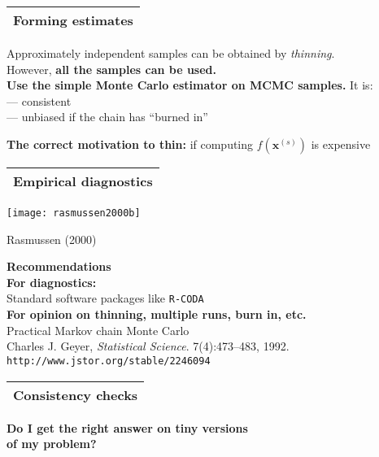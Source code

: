 \documentclass[25pt,landscape]{foils}
\newcommand{\Gray}{\textcolor{mygray}}
\newcommand{\Green}{\textcolor{mypine}}
\newcommand{\myfoilhead}[1]{
\newpage
\vspace*{-1cm}
\Gray{
\begin{tabular*}{\textwidth}{l}
{\bf \Huge #1} \\
\bottomrule
\end{tabular*}}}
\newcommand{\bx}{\mathbf{x}}
\begin{document}
\myfoilhead{Forming estimates}

\vfill

Approximately independent samples can be obtained by \emph{thinning}.\\
However, \Green{\bf all the samples can be used.}\\

\Green{\bf Use the simple Monte Carlo estimator on MCMC samples.} It is:\\
\hspace*{3cm}--- consistent\\
\hspace*{3cm}--- unbiased if the chain has ``burned in''

\vfill
\Green{\bf The correct motivation to thin:} if computing $f(\bx^{(s)})$ is expensive
\vfill

\myfoilhead{Empirical diagnostics}

\vspace*{1cm}

\centerline{\texttt{[image: rasmussen2000b]}}
\begin{flushright}
    \Gray{Rasmussen (2000)}
\end{flushright}

\vfill

{\Green{\bf Recommendations}\\[-0.2in]

\small \textbf{For diagnostics:}\\
Standard software packages like \texttt{R-CODA}\\[-0.2in]

\textbf{For opinion on thinning, multiple runs, burn in, etc.}\\
Practical Markov chain Monte Carlo\\[-0.1in]
Charles J. Geyer, \textit{Statistical Science}. 7(4):473--483, 1992.\\[-0.1in]
\texttt{http://www.jstor.org/stable/2246094}}

\myfoilhead{Consistency checks}

\vspace*{3cm}

\Green{\large \bf Do I get the right answer on tiny versions\\[0.1in] of my problem?}
\end{document}
